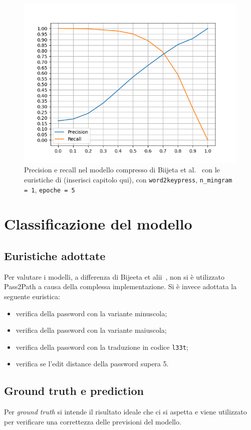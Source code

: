 \begin{figure}[H]
    \centering
    \includegraphics[width=11.5cm]{./immagini/CORRETTO_w2kp_nmingram=1_epochs=5.png}
    \caption{Precision e recall nel modello compresso di Biijeta et al.~\cite{biijeta} con le euristiche di (inserisci capitolo qui), con \texttt{word2keypress}, \texttt{n\_mingram = 1}, \texttt{epoche = 5}}
    \label{primomodello}
\end{figure}

\section{Classificazione del modello}
\subsection{Euristiche adottate}
Per valutare i modelli, a differenza di Bijeeta et alii~\cite{biijeta}, non si è utilizzato Pass2Path a causa della complessa implementazione. Si è invece adottata la seguente euristica:
\begin{itemize}
    \item verifica della password con la variante minuscola;
    \item verifica della password con la variante maiuscola;
    \item verifica della password con la traduzione in codice \texttt{l33t};
    \item verifica se l'edit distance della password supera 5.
\end{itemize}

\subsection{Ground truth e prediction}
Per \emph{ground truth} si intende il risultato ideale che ci si aspetta e viene utilizzato per verificare una correttezza delle previsioni del modello.~\cite{lemoigne2008molecular}

